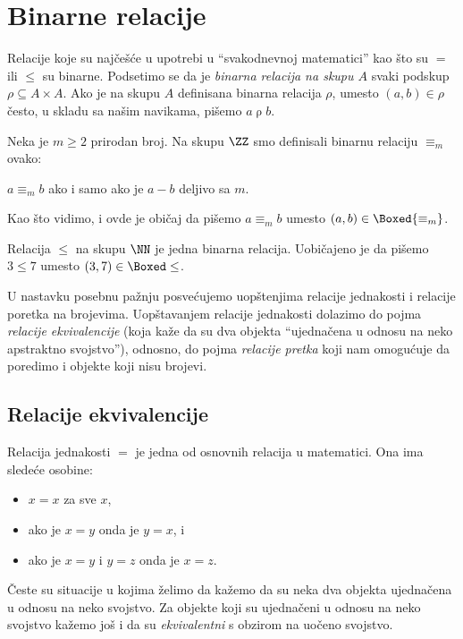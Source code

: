 \chapter{Binarne relacije}

Relacije koje su naj\v ce\v s\'ce u upotrebi u ``svakodnevnoj matematici'' kao \v sto su $=$ ili $\le$ su binarne.
Podsetimo se da je \emph{binarna relacija na skupu $A$} svaki podskup $\rho \subseteq A \times A$.
Ako je na skupu $A$ definisana binarna relacija $\rho$, umesto $(a, b) \in \rho$ \v cesto, u skladu sa na\v sim navikama, pi\v semo
$a \mathrel\rho b$.

\begin{EX}\label{ft07.ex.equiv}
  Neka je $m \ge 2$ prirodan broj. Na skupu $\ZZ$ smo definisali binarnu relaciju $\equiv_m$ ovako:
  \begin{center}
    $a \equiv_m b$ ako i samo ako je $a - b$ deljivo sa $m$.
  \end{center}
  Kao \v sto vidimo, i ovde je obi\v caj da pi\v semo $a \equiv_m b$ umesto $(a, b) \in \Boxed{\equiv_m}$.
\end{EX}

\begin{EX}
  Relacija $\le$ na skupu $\NN$ je jedna binarna relacija. Uobi\v cajeno je da pi\v semo $3 \le 7$ umesto $(3, 7) \in \Boxed\le$.
\end{EX}

U nastavku posebnu pa\v znju posve\'cujemo uop\v stenjima relacije jednakosti i relacije poretka na brojevima.
Uop\v stavanjem relacije jednakosti dolazimo do pojma \emph{relacije ekvivalencije} (koja ka\v ze da su dva
objekta ``ujedna\v cena u odnosu na neko apstraktno svojstvo''), odnosno, do pojma \emph{relacije pretka} koji nam
omogu\'cuje da poredimo i objekte koji nisu brojevi.

\clearpage
\section{Relacije ekvivalencije}

Relacija jednakosti $=$ je jedna od osnovnih relacija u matematici. Ona ima slede\'ce osobine:
\begin{itemize}\itemsep -1.5pt
\item $x = x$ za sve $x$,
\item ako je $x = y$ onda je $y = x$, i
\item ako je $x = y$ i $y = z$ onda je $x = z$.
\end{itemize}
\v Ceste su situacije u kojima \v zelimo da ka\v zemo da su neka dva objekta ujedna\v cena u odnosu na neko svojstvo.
Za objekte koji su ujedna\v ceni u odnosu na neko svojstvo ka\v zemo jo\v s i da su \emph{ekvivalentni} s obzirom na
uo\v ceno svojstvo.

